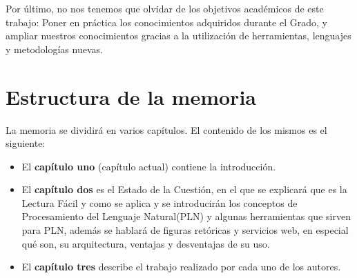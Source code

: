 Por último, no nos tenemos que olvidar de los objetivos académicos de este trabajo: Poner en práctica los conocimientos adquiridos durante el Grado, y ampliar nuestros conocimientos gracias a la utilización de herramientas, lenguajes y metodologías nuevas.
	
	
\section{Estructura de la memoria}
\label{cap:sec:estructuramemoria}

La memoria se dividirá en varios capítulos. El contenido de los mismos es el siguiente:
\begin{itemize}
	\item El \textbf{capítulo uno} (capítulo actual) contiene la introducción.
	\item El \textbf{capítulo dos} es el Estado de la Cuestión, en el que se explicará que es la Lectura Fácil y como se aplica y se introducirán los conceptos de Procesamiento del Lenguaje Natural(PLN) y algunas herramientas que sirven para PLN, además se hablará de figuras retóricas y servicios web, en especial qué son, su arquitectura, ventajas y desventajas de su uso.
	\item El \textbf{capítulo tres} describe el trabajo realizado por cada uno de los autores.
\end{itemize}